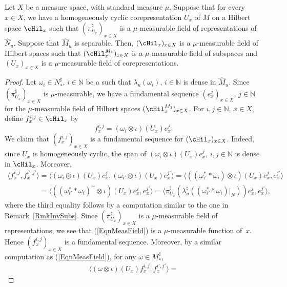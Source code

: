 \begin{prop}\label{PropMeas}
Let $X$ be a measure space, with standard measure $\mu$. Suppose that for every $x \in X$, we have a homogeneously cyclic corepresentation $U_x$ of $M$ on a Hilbert space $\cHil_x$ such that $(\pi_{U_x}^\natural)_{x \in X}$ is a $\mu$-measurable field of representations of $\hat{N}_u$. Suppose that $\hat{M}_u$ is separable. Then, $(\cHil_x)_{x \in X}$ is a $\mu$-measurable field of Hilbert spaces such that $(\cHil_x^{M_1})_{x \in X}$ is a $\mu$-measurable field of subspaces and $(U_x)_{x \in X}$ is a $\mu$-measurable field of corepresentations.
\end{prop}
\begin{proof}
Let $\omega_i \in N_\ast^\sharp$, $i \in \mathbb{N}$ be a such that $\lambda_u(\omega_i)$, $i \in \mathbb{N}$ is dense in $\hat{M}_u$. Since $(\pi_{U_x}^\natural)_{x \in X}$ is $\mu$-measurable, we have a fundamental sequence $(e_x^j)_{x\in X}$, $j \in \mathbb{N}$ for the $\mu$-measurable f\/ield of Hilbert spaces $(\cHil_x^{M_1})_{x \in X}$. For $i, j \in \mathbb{N}$, $x \in X$, def\/ine $f^{i,j}_x \in \cHil_x$ by
\[
f^{i,j}_x = (\omega_i \otimes \iota)(U_x) e^j_x.
\]
We claim that $(f^{i,j}_x)_{x\in X}$ is a fundamental sequence for $(\cHil_x)_{x \in X}$. Indeed, since $U_x$ is homogeneously cyclic, the span of $(\omega_i \otimes \iota)(U_x) e^j_x$, $i, j \in \mathbb{N}$ is dense in $\cHil_x$. Moreover,
\begin{gather}
\langle f^{i,j}_x , f^{i',j'}_x \rangle =   \langle (\omega_i \otimes \iota)(U_x) e^j_x, (\omega_{i'} \otimes \iota)(U_x) e^{j'}_x \rangle =
\langle ((\omega_{i'}^\ast \ast \omega_i) \otimes \iota)(U_x) e^j_x, e^{j'}_x \rangle
\nonumber \\
\phantom{\langle f^{i,j}_x , f^{i',j'}_x \rangle}{}
=
\langle ((\omega_{i'}^\ast \ast \omega_i)^\sim \otimes \iota)(U_x) e^j_x, e^{j'}_x \rangle = \langle \pi_{U_x}^\natural(\lambda_u^\natural((\omega_{i'}^\ast \ast \omega_i)\vert_N))  e^j_x, e^{j'}_x \rangle,\label{EqnMeasField}
\end{gather}
where the third equality follows by a computation similar to the one in Remark~\ref{RmkInvSubs}.
Since $(\pi_{U_x}^\natural)_{x\in X}$ is a $\mu$-measurable f\/ield of representations, we see that (\ref{EqnMeasField}) is a $\mu$-measurable function of~$x$. Hence $(f^{i,j}_x)_{x\in X}$ is a fundamental sequence. Moreover, by a similar computation as (\ref{EqnMeasField}), for any $\omega \in M_\ast^\sharp$,
\begin{gather*}
\langle (\omega \otimes \iota)(U_x) f^{i,j}_x, f^{i',j'}_x \rangle =

\end{gather*}
\end{proof}
